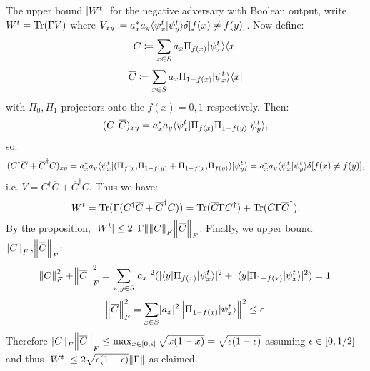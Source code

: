 The upper bound $\lvert W^t \rvert$ for the negative adversary with Boolean output, write $W^t = \mathrm{Tr}(\Gamma V)$ where $V_{xy} \coloneqq a_x^*a_y\langle \psi^t_x \lvert \psi^t_y \rangle\delta[f(x) \neq f(y)]$. Now define:
\begin{equation}
    C \coloneqq \sum_{x \in S}a_x\Pi_{f(x)}\lvert \psi^t_x \rangle \langle x \rvert
\end{equation}
\begin{equation}
    \overline{C} \coloneqq \sum_{x \in S}a_x\Pi_{1-f(x)}\lvert \psi^t_x \rangle \langle x \rvert
\end{equation}
with $\Pi_0, \Pi_1$ projectors onto the $f(x)=0,1$ respectively. Then:
\begin{equation}
    (C^\dagger\overline{C})_{xy} = a_x^*a_y\langle \psi^t_x \rvert\Pi_{f(x)}\Pi_{1-f(y)}\lvert \psi^t_y \rangle,
\end{equation}
so:
\begin{equation}
    (C^\dagger \overline{C} + \overline{C}^\dagger C)_{xy} = a_x^*a_y\langle \psi_x^t \rvert(\Pi_{f(x)}\Pi_{1-f(y)} + \Pi_{1-f(x)}\Pi_{f(y)})\lvert \psi^t_y \rangle = a_x^*a_y\langle \psi_x^t \lvert \psi_y^t \rangle\delta[f(x) \neq f(y)],
\end{equation}
i.e. $V = C^\dag \overline{C} + \overline{C}^\dag C$. Thus we have:
\begin{equation}
    W^t = \mathrm{Tr}(\Gamma(C^\dagger\overline{C} + \overline{C}^\dagger C)) = \mathrm{Tr}(\overline{C}\Gamma C^\dagger) + \mathrm{Tr}(C\Gamma\overline{C}^\dagger).
\end{equation}
By the proposition, $\lvert W^t \rvert \leq 2\norm{\Gamma}\norm{C}_F\norm{\overline{C}}_F$. Finally, we upper bound $\norm{C}_F, \norm{\overline{C}}_F$:
\begin{equation}
    \norm{C}_F^2 + \norm{\overline{C}}_F^2 = \sum_{x, y \in S}\lvert a_x \rvert^2(\lvert \langle y \rvert\Pi_{f(x)}\lvert \psi^t_x \rangle \rvert^2 + \lvert \langle y \rvert\Pi_{1-f(x)}\lvert \psi^t_x \rangle \rvert^2)=1
\end{equation}
\begin{equation}
    \norm{\overline{C}}_F^2 = \sum_{x \in S}\lvert a_x \rvert^2\norm{\Pi_{1-f(x)}\lvert \psi_x^t \rangle}^2 \leq \epsilon
\end{equation}
Therefore $\norm{C}_F\norm{\overline{C}}_F \leq \max_{x \in [0, \epsilon]}\sqrt{x(1-x)} = \sqrt{\epsilon(1-\epsilon)}$ assuming $\epsilon \in [0, 1/2]$ and thus $\lvert W^t \rvert \leq 2\sqrt{\epsilon(1-\epsilon)}\norm{\Gamma}$ as claimed.

